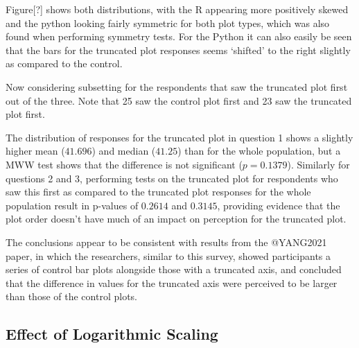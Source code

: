 \documentclass[
]{article}
\newenvironment{Shaded}{\begin{snugshade}}{\end{snugshade}}
\newcommand{\CommentTok}[1]{\textcolor[rgb]{0.56,0.35,0.01}{\textit{#1}}}
\newcommand{\DecValTok}[1]{\textcolor[rgb]{0.00,0.00,0.81}{#1}}
\newcommand{\KeywordTok}[1]{\textcolor[rgb]{0.13,0.29,0.53}{\textbf{#1}}}
\newcommand{\NormalTok}[1]{#1}
\newcommand{\OperatorTok}[1]{\textcolor[rgb]{0.81,0.36,0.00}{\textbf{#1}}}
\newcommand{\StringTok}[1]{\textcolor[rgb]{0.31,0.60,0.02}{#1}}
\begin{document}
Figure{[}?{]} shows both distributions, with the R appearing more
positively skewed and the python looking fairly symmetric for both plot
types, which was also found when performing symmetry tests. For the
Python it can also easily be seen that the bars for the truncated plot
responses seems `shifted' to the right slightly as compared to the
control.

Now considering subsetting for the respondents that saw the truncated
plot first out of the three. Note that 25 saw the control plot first and
23 saw the truncated plot first.

The distribution of responses for the truncated plot in question 1 shows
a slightly higher mean (\(41.696\)) and median (\(41.25\)) than for the
whole population, but a MWW test shows that the difference is not
significant (\(p=0.1379\)). Similarly for questions 2 and 3, performing
tests on the truncated plot for respondents who saw this first as
compared to the truncated plot responses for the whole population result
in p-values of \(0.2614\) and \(0.3145\), providing evidence that the
plot order doesn't have much of an impact on perception for the
truncated plot.

The conclusions appear to be consistent with results from the @YANG2021
paper, in which the researchers, similar to this survey, showed
participants a series of control bar plots alongside those with a
truncated axis, and concluded that the difference in values for the
truncated axis were perceived to be larger than those of the control
plots.

\subsection{Effect of Logarithmic Scaling}

\begin{Shaded}
\end{Shaded}
\end{document}
